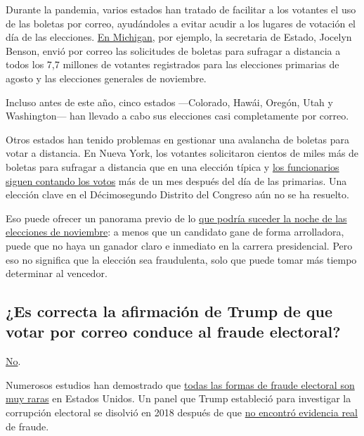 Durante la pandemia, varios estados han tratado de facilitar a los
votantes el uso de las boletas por correo, ayudándoles a evitar acudir a
los lugares de votación el día de las elecciones.
\href{https://www.nytimes3xbfgragh.onion/2020/05/20/us/politics/trump-mail-in-voting-absentee-ballots.html}{En
Michigan}, por ejemplo, la secretaria de Estado, Jocelyn Benson, envió
por correo las solicitudes de boletas para sufragar a distancia a todos
los 7,7 millones de votantes registrados para las elecciones primarias
de agosto y las elecciones generales de noviembre.

Incluso antes de este año, cinco estados ---Colorado, Hawái, Oregón,
Utah y Washington--- han llevado a cabo sus elecciones casi
completamente por correo.

Otros estados han tenido problemas en gestionar una avalancha de boletas
para votar a distancia. En Nueva York, los votantes solicitaron cientos
de miles más de boletas para sufragar a distancia que en una elección
típica y
\href{https://www.nytimes3xbfgragh.onion/2020/07/17/nyregion/election-absentee-ballots-primary.html}{los
funcionarios siguen contando los votos} más de un mes después del día de
las primarias. Una elección clave en el Décimosegundo Distrito del
Congreso aún no se ha resuelto.

Eso puede ofrecer un panorama previo de lo
\href{https://www.nytimes3xbfgragh.onion/2020/06/24/us/politics/november-2020-election-day-results.html}{que
podría suceder la noche de las elecciones de noviembre}: a menos que un
candidato gane de forma arrolladora, puede que no haya un ganador claro
e inmediato en la carrera presidencial. Pero eso no significa que la
elección sea fraudulenta, solo que puede tomar más tiempo determinar al
vencedor.

\hypertarget{es-correcta-la-afirmaciuxf3n-de-trump-de-que-votar-por-correo-conduce-al-fraude-electoral}{%
\subsection{¿Es correcta la afirmación de Trump de que votar por correo
conduce al fraude
electoral?}\label{es-correcta-la-afirmaciuxf3n-de-trump-de-que-votar-por-correo-conduce-al-fraude-electoral}}

\href{https://www.nytimes3xbfgragh.onion/article/mail-in-voting-explained.html}{No}.

Numerosos estudios han demostrado que
\href{https://www.nytimes3xbfgragh.onion/article/mail-in-voting-explained.html}{todas
las formas de fraude electoral son muy raras} en Estados Unidos. Un
panel que Trump estableció para investigar la corrupción electoral se
disolvió en 2018 después de que
\href{https://www.nytimes3xbfgragh.onion/2018/01/03/us/politics/trump-voter-fraud-commission.html}{no
encontró evidencia real} de fraude.

